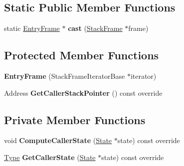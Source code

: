 \subsection*{Static Public Member Functions}
\begin{DoxyCompactItemize}
\item 
static \hyperlink{classv8_1_1internal_1_1_entry_frame}{Entry\+Frame} $\ast$ {\bfseries cast} (\hyperlink{classv8_1_1_stack_frame}{Stack\+Frame} $\ast$frame)\hypertarget{classv8_1_1internal_1_1_entry_frame_a099b83b55ccf792d0c7a9efb9b58a688}{}\label{classv8_1_1internal_1_1_entry_frame_a099b83b55ccf792d0c7a9efb9b58a688}

\end{DoxyCompactItemize}
\subsection*{Protected Member Functions}
\begin{DoxyCompactItemize}
\item 
{\bfseries Entry\+Frame} (Stack\+Frame\+Iterator\+Base $\ast$iterator)\hypertarget{classv8_1_1internal_1_1_entry_frame_a785f12a4457418661ccaa5f616aac5c9}{}\label{classv8_1_1internal_1_1_entry_frame_a785f12a4457418661ccaa5f616aac5c9}

\item 
Address {\bfseries Get\+Caller\+Stack\+Pointer} () const  override\hypertarget{classv8_1_1internal_1_1_entry_frame_a76b12e4a5a3e45b673dd2014a7763ab9}{}\label{classv8_1_1internal_1_1_entry_frame_a76b12e4a5a3e45b673dd2014a7763ab9}

\end{DoxyCompactItemize}
\subsection*{Private Member Functions}
\begin{DoxyCompactItemize}
\item 
void {\bfseries Compute\+Caller\+State} (\hyperlink{classv8_1_1internal_1_1_state}{State} $\ast$state) const  override\hypertarget{classv8_1_1internal_1_1_entry_frame_a87144c61f0f1b85e7242d14e3d1f96ae}{}\label{classv8_1_1internal_1_1_entry_frame_a87144c61f0f1b85e7242d14e3d1f96ae}

\item 
\hyperlink{classv8_1_1internal_1_1_type}{Type} {\bfseries Get\+Caller\+State} (\hyperlink{classv8_1_1internal_1_1_state}{State} $\ast$state) const  override\hypertarget{classv8_1_1internal_1_1_entry_frame_abbc07be15c9ded235c5690f10e0656d0}{}\label{classv8_1_1internal_1_1_entry_frame_abbc07be15c9ded235c5690f10e0656d0}

\end{DoxyCompactItemize}
